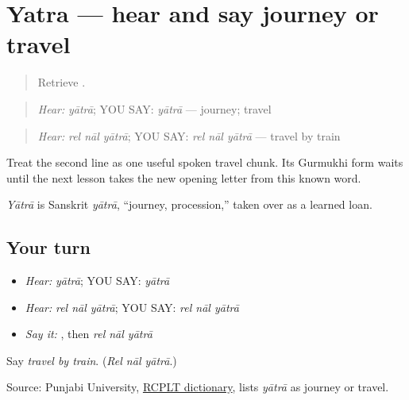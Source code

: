 \section[yātrā]{Yatra — hear and say journey or travel}

\label{lesson:PA-C181-yatra}



\begin{quote}
Retrieve \textbf{  }.
\end{quote}

\begin{grammarlens}[title={Grammar Lens: one journey word by ear}]
\begin{quote}
\emph{Hear:} \emph{yātrā}; YOU SAY: \emph{yātrā} — journey; travel
\end{quote}

\begin{quote}
\emph{Hear:} \emph{rel nāl yātrā}; YOU SAY: \emph{rel nāl yātrā} — travel by train
\end{quote}

Treat the second line as one useful spoken travel chunk. Its Gurmukhi form waits until the next lesson takes the new opening letter from this known word.
\end{grammarlens}

\begin{cousinweb}
\emph{Yātrā} is Sanskrit \emph{yātrā}, “journey, procession,” taken over as a learned loan.
\end{cousinweb}

\subsection*{Your turn}
\begin{itemize}
\raggedright
  \item \emph{Hear:} \emph{yātrā}; YOU SAY: \emph{yātrā}
  \item \emph{Hear:} \emph{rel nāl yātrā}; YOU SAY: \emph{rel nāl yātrā}
  \item \emph{Say it:} \textbf{  }, then \emph{rel nāl yātrā}
\end{itemize}

\begin{tcolorbox}[breakable,colback=teal!4,colframe=teal!35!black,title={Before you move on}]
Say \emph{travel by train}. (\emph{Rel nāl yātrā}.)

Source: Punjabi University, \href{https://dic.learnpunjabi.org/default.aspx?look=\%E0\%A8\%AF\%E0\%A8\%BE\%E0\%A8\%A4\%E0\%A8\%B0\%E0\%A8\%BE}{RCPLT dictionary}, lists \emph{yātrā} as journey or travel.
\end{tcolorbox}
